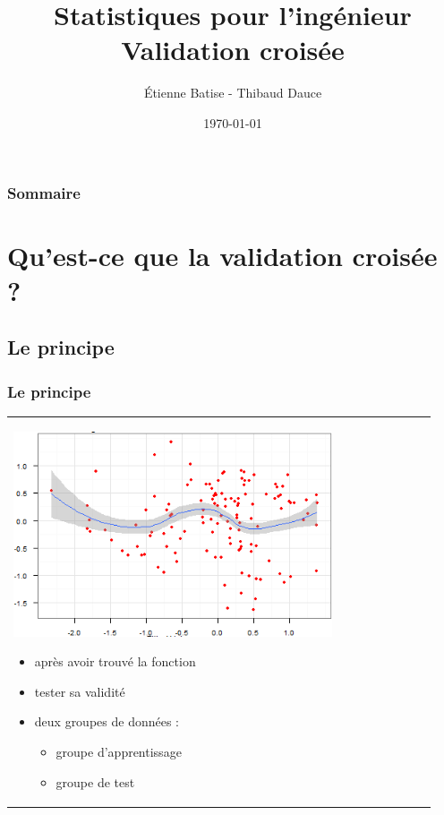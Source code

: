 \documentclass[handout]{beamer}
\title[Stats]{
	Statistiques pour l'ingénieur\\
	Validation croisée
}
\author{
	Étienne Batise - Thibaud Dauce
}
\date{\today}
\begin{document}
	
	\begin{frame}[plain]
		\titlepage
	\end{frame}

	\begin{frame}[plain]
		\frametitle{Sommaire}
		\tableofcontents
	\end{frame}


	\section{Qu'est-ce que la validation croisée ?}

	\subsection{Le principe}
		\begin{frame}
		\frametitle{Le principe}
		\begin{tabular}{l l}
			\begin{minipage}{0.5\textwidth}
				\begin{center}
					\includegraphics[width=0.8\textwidth]{images/function.png}
				\end{center}
			\end{minipage}

			\begin{minipage}{0.5\textwidth}
				\begin{itemize}
					\item après avoir trouvé la fonction
					\item tester sa validité
					\item deux groupes de données :
						\begin{itemize}
							\item groupe d'apprentissage
							\item groupe de test
						\end{itemize}
				\end{itemize}
			\end{minipage}
			
		\end{tabular}
		\end{frame}
\end{document}
